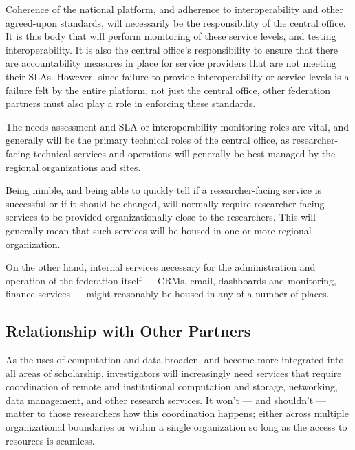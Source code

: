 \documentclass[11pt, letterpaper, twoside]{article}
\begin{document}
Coherence of the national platform, and adherence to interoperability
and other agreed-upon standards, will necessarily be the responsibility
of the central office. It is this body that will perform monitoring of
these service levels, and testing interoperability. It is also the
central office's responsibility to ensure that there are accountability
measures in place for service providers that are not meeting their SLAs.
However, since failure to provide interoperability or service levels is
a failure felt by the entire platform, not just the central office,
other federation partners must also play a role in enforcing these
standards.

The needs assessment and SLA or interoperability monitoring roles are
vital, and generally will be the primary technical roles of the central
office, as researcher-facing technical services and operations will
generally be best managed by the regional organizations and sites.


Being nimble, and being able to quickly tell if a researcher-facing
service is successful or if it should be changed, will normally require
researcher-facing services to be provided organizationally close to the
researchers. This will generally mean that such services will be housed
in one or more regional organization.

On the other hand, internal services necessary for the administration
and operation of the federation itself --- CRMs, email, dashboards and
monitoring, finance services --- might reasonably be housed in any of a
number of places.

\subsection*{Relationship with Other Partners}
%

As the uses of computation and data broaden, and become more integrated
into all areas of scholarship, investigators will increasingly need
services that require coordination of remote and institutional
computation and storage, networking, data management, and other research
services. It won't --- and shouldn't --- matter to those researchers how
this coordination happens; either across multiple organizational
boundaries or within a single organization so long as the access to
resources is seamless.
\end{document}
